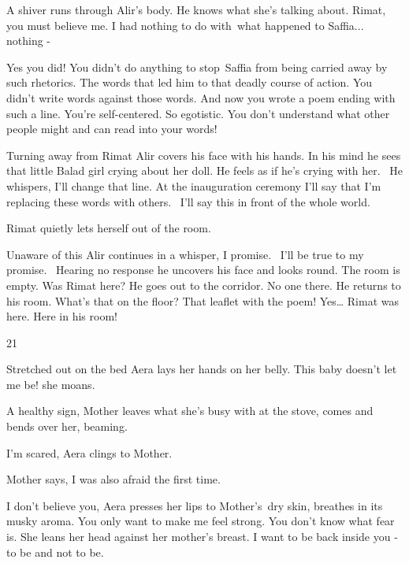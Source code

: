 \documentclass[12pt]{book}
\begin{document}
A shiver runs through Alir's body. He knows what she's talking about. {\textquotedbl}Rimat, you must believe me. I had
nothing to do with~what happened to Saffia... nothing - {\textquotedbl}

{\textquotedbl}Yes you did! You didn't do anything to stop~Saffia from being carried away by such rhetorics. The words
that led him to that deadly course of action. You didn't write words against those words. And now you wrote a poem
ending with such a line. You're self-centered. So egotistic.{ }You
don't understand what other people might and can read into your words!{\textquotedbl}

Turning away from Rimat Alir covers his face with his hands. In his mind he sees that little Balad girl crying about her
doll. He feels as if he's crying with her. ~He whispers, {\textquotedbl}I'll change that line. At the inauguration
ceremony I'll say that I'm replacing these words with others.~ I'll say this in front of the whole
world.{\textquotedbl}

Rimat quietly lets herself out of the room.

Unaware of this Alir continues in a whisper, {\textquotedbl}I promise. \ I'll be true to my promise.{\textquotedbl}~
Hearing no response he uncovers his face and looks round. The room is empty. Was Rimat here? He goes out to the
corridor. No one there. He returns to his room. What's that on the floor? That leaflet with the poem! Yes{\dots} Rimat
was here. Here in his room!


\bigskip

21

Stretched out on the bed Aera lays her hands on her belly. {\textquotedbl}This baby doesn't let me be!{\textquotedbl}
she moans.

{\textquotedbl}A healthy sign,{\textquotedbl} Mother leaves what she's busy with at the stove, comes and bends over her,
beaming.

{\textquotedbl}I'm scared,{\textquotedbl} Aera clings to Mother{.}

Mother says, {\textquotedbl}I was also afraid the{ }first time.{\textquotedbl}

{\textquotedbl}I don't believe you,{\textquotedbl} Aera presses her lips{ }to Mother's~dry skin, breathes
in its musky aroma. {\textquotedbl}You only want to make me feel strong. You don't know what fear is.{\textquotedbl}
She leans her head against her mother's breast. {\textquotedbl}I want to be back inside you - to be and not to
be.{\textquotedbl}
\end{document}
